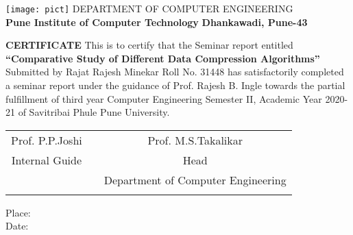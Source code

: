 \documentclass[a4paper, 12pt]{article}
\begin{document}
\begin{titlepage}
\begin{center}
	\texttt{[image: pict]} 
	\linebreak
	\Large
        DEPARTMENT OF COMPUTER ENGINEERING\\
        \textbf{Pune Institute of Computer Technology}
		\linebreak
		\textbf{Dhankawadi, Pune-43}
		\vspace{0.8cm}
		\Large
		
	    \textbf{CERTIFICATE}
	    		\linebreak
	    \linebreak
		This is to certify that the Seminar report entitled
        \linebreak
		\linebreak
		\large
		\textbf{“Comparative Study of Different Data Compression Algorithms”}
		\linebreak
		\linebreak
		Submitted by
		\linebreak
		Rajat Rajesh Minekar \hspace{10mm}   Roll No. 31448 \linebreak
		\linebreak
		has satisfactorily completed a seminar report under the guidance of Prof. Rajesh B. Ingle  towards the partial fulfillment of third year Computer Engineering Semester II, Academic Year 2020-21 of Savitribai Phule Pune University. 
		\linebreak
		\linebreak
		\linebreak
		\linebreak
		\linebreak
		\begin{table}[h]
		\begin{tabular}{ccc}
		Prof. P.P.Joshi    &                        &  \hspace{52mm} Prof. M.S.Takalikar\\
		Internal Guide      &                     &    \hspace{52mm} Head \\
		          &                         &       \hspace{47mm} Department of Computer Engineering \\
                    &                       & \hspace{52mm} 
		\end{tabular}
		\end{table}
		\end{center}
Place:\\
Date:

\end{titlepage} 
\end{document}
